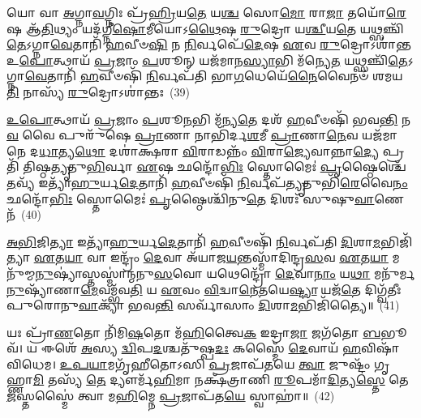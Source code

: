 {\anuvakamend[{\-\ul{𑌅}\-𑌗𑍍𑌨𑌯𑍇\-𑌽𑌦𑌿᳴\-\ul{𑌤𑍍𑌯𑌾} 𑌅𑌨𑍁᳴𑌮𑌤𑍍𑌯𑍈 \ul{𑌸}\-𑌪𑍍𑌤𑌚᳴𑌤𑍍𑌵𑌾𑌰𑌿𑍞𑌶𑌤𑍍}]}%

𑌯𑍋 𑌵𑌾 \ul{𑌅}\-𑌗𑍍𑌨𑌾\-\ul{𑌵}\-𑌗𑍍𑌨𑌿𑌃 𑌪𑍍𑌰᳴\-\ul{𑌹𑍍𑌰𑌿}\-𑌯\-\ul{𑌤𑍇} 𑌯\-\ul{𑌶𑍍𑌚} 𑌸𑍋\-\ul{𑌮𑍋} 𑌰𑌾\-\ul{𑌜𑌾} 𑌤𑌯𑍋᳴\-\ul{𑌰𑍇}\-𑌷 𑌆᳴\-\ul{𑌤𑌿}\-𑌥𑍍𑌯𑌂 𑌯𑌦᳴𑌗𑍍𑌨𑍀\-\ul{𑌷𑍋}\-𑌮𑍀𑌯𑍋\-𑌽\-\ul{𑌥𑍈}\-𑌷 \ul{𑌰𑍁}\-𑌦𑍍𑌰𑍋 𑌯\-\ul{𑌶𑍍𑌚𑍀}\-𑌯\-\ul{𑌤𑍇} 𑌯𑌥𑍍𑌸𑌞𑍍𑌚𑌿᳴\-\ul{𑌤𑍇}\-\-𑌽𑌗𑍍𑌨𑌾\-\ul{𑌵𑍇}\-𑌤𑌾𑌨𑌿᳴ \ul{𑌹}\-𑌵𑍀𑍞\-\ul{𑌷𑌿} 𑌨 \ul{𑌨𑌿}\-𑌰𑍍𑌵𑌪𑍇᳴\-\ul{𑌦𑍇}\-𑌷 \ul{𑌏}\-𑌵 \ul{𑌰𑍁}\-𑌦𑍍𑌰𑍋\-𑌽𑌶𑌾॑𑌨𑍍𑌤 𑌉\-\ul{𑌪𑍋}\-𑌤𑍍𑌥𑌾𑌯᳴ \ul{𑌪𑍍𑌰}\-𑌜𑌾𑌂 \ul{𑌪}\-𑌶𑍂𑌨𑍍 𑌯𑌜᳴𑌮𑌾𑌨\-\ul{𑌸𑍍𑌯𑌾}\-𑌭𑌿 𑌮᳴𑌨𑍍𑌯𑍇\-\ul{𑌤} 𑌯𑌥𑍍𑌸𑌞𑍍𑌚𑌿᳴\-\ul{𑌤𑍇}\-\-𑌽𑌗𑍍𑌨𑌾\-\ul{𑌵𑍇}\-𑌤𑌾𑌨𑌿᳴ \ul{𑌹}\-𑌵𑍀𑍞𑌷𑌿᳴ \ul{𑌨𑌿}\-𑌰𑍍𑌵𑌪᳴𑌤𑌿 𑌭𑌾\-\ul{𑌗}\-𑌧𑍇𑌯𑍇᳴\-\ul{𑌨𑍈}\-𑌵𑍈𑌨𑍞᳴ 𑌶𑌮𑌯\-\ul{𑌤𑌿} 𑌨𑌾𑌸𑍍𑌯᳴ \ul{𑌰𑍁}\-𑌦𑍍𑌰𑍋\-𑌽𑌶𑌾॑𑌨𑍍𑌤𑌃~(39)

\-\ul{𑌉}\-\-\ul{𑌪𑍋}\-𑌤𑍍𑌥𑌾𑌯᳴ \ul{𑌪𑍍𑌰}\-𑌜𑌾𑌂 \ul{𑌪}\-𑌶𑍂\-\ul{𑌨}\-𑌭𑌿 𑌮᳴𑌨𑍍𑌯\-\ul{𑌤𑍇} 𑌦𑌶᳴ \ul{𑌹}\-𑌵𑍀𑍞𑌷𑌿᳴ 𑌭𑌵\-\ul{𑌨𑍍𑌤𑌿} 𑌨\-\ul{𑌵} 𑌵𑍈 𑌪𑍁𑌰𑍁᳴𑌷𑍇 \ul{𑌪𑍍𑌰𑌾}\-𑌣𑌾 𑌨𑌾𑌭𑌿᳴𑌰𑍍𑌦\-\ul{𑌶}\-𑌮𑍀 \ul{𑌪𑍍𑌰𑌾}\-𑌣𑌾\-\ul{𑌨𑍇}\-𑌵 𑌯𑌜᳴𑌮𑌾𑌨𑍇 𑌦\-\ul{𑌧𑌾}\-𑌤𑍍𑌯\-\ul{𑌥𑍋} 𑌦𑌶𑌾॑𑌕𑍍𑌷𑌰𑌾 \ul{𑌵𑌿}\-𑌰𑌾𑌡𑌨𑍍𑌨𑌂᳴ \ul{𑌵𑌿}\-𑌰𑌾\-\ul{𑌜𑍍𑌯𑍇}\-𑌵𑌾𑌨𑍍𑌨𑌾\-\ul{𑌦𑍍𑌯𑍇} 𑌪𑍍𑌰𑌤𑌿᳴ 𑌤𑌿𑌷𑍍𑌠\-\ul{𑌤𑍍𑌯𑍃}\-𑌤𑍁\-\ul{𑌭𑌿}\-𑌰𑍍𑌵𑌾 \ul{𑌏}\-𑌷 𑌛𑌨𑍍𑌦𑍋᳴\-\ul{𑌭𑌿𑌃} 𑌸𑍍𑌤𑍋𑌮𑍈𑌃॑ \ul{𑌪𑍃}\-𑌷𑍍𑌠𑍈𑌶𑍍𑌚𑍇᳴\-\ul{𑌤}\-𑌵𑍍𑌯᳴ 𑌇𑌤𑍍𑌯𑌾᳴\-\ul{𑌹𑍁}\-𑌰𑍍𑌯\-\ul{𑌦𑍇}\-𑌤𑌾𑌨𑌿᳴ \ul{𑌹}\-𑌵𑍀𑍞𑌷𑌿᳴ \ul{𑌨𑌿}\-𑌰𑍍𑌵𑌪᳴\-\ul{𑌤𑍍𑌯𑍃}\-𑌤𑍁𑌭𑌿᳴\-\ul{𑌰𑍇}\-𑌵𑍈\-\ul{𑌨𑌂} 𑌛𑌨𑍍𑌦𑍋᳴\-\ul{𑌭𑌿𑌃} 𑌸𑍍𑌤𑍋𑌮𑍈𑌃॑ \ul{𑌪𑍃}\-𑌷𑍍𑌠𑍈𑌶𑍍𑌚𑌿᳴𑌨𑍁\-\ul{𑌤𑍇} 𑌦𑌿𑌶𑌃᳴ 𑌸𑍁𑌷𑍁\-\ul{𑌵𑌾}\-𑌣𑍇𑌨᳴~(40)

\-\ul{𑌅}\-\-\ul{𑌭𑌿}\-𑌜𑌿\-\ul{𑌤𑍍𑌯𑌾} 𑌇𑌤𑍍𑌯𑌾᳴\-\ul{𑌹𑍁}\-𑌰𑍍𑌯\-\ul{𑌦𑍇}\-𑌤𑌾𑌨𑌿᳴ \ul{𑌹}\-𑌵𑍀𑍞𑌷𑌿᳴ \ul{𑌨𑌿}\-𑌰𑍍𑌵𑌪᳴𑌤𑌿 \ul{𑌦𑌿}\-𑌶𑌾\-\ul{𑌮}\-𑌭𑌿𑌜𑌿᳴𑌤𑍍𑌯𑌾 \ul{𑌏}\-𑌤\-\ul{𑌯𑌾} 𑌵𑌾 𑌇𑌨𑍍𑌦𑍍𑌰𑌂᳴ \ul{𑌦𑍇}\-𑌵𑌾 𑌅᳴𑌯𑌾𑌜\-\ul{𑌯}\-𑌨𑍍𑌤𑌸𑍍𑌮𑌾᳴𑌦𑌿𑌨𑍍𑌦𑍍𑌰\-\ul{𑌸}\-𑌵 \ul{𑌏}\-𑌤\-\ul{𑌯𑌾} 𑌮𑌨𑍁᳴𑌮𑍍𑌮\-\ul{𑌨𑍁}\-𑌷𑍍𑌯𑌾॑𑌸𑍍𑌤𑌸𑍍𑌮𑌾॑𑌨𑍍𑌮𑌨𑍁\-\ul{𑌸}\-𑌵𑍋 𑌯𑌥𑍇𑌨𑍍𑌦𑍍𑌰𑍋᳴ \ul{𑌦𑍇}\-𑌵𑌾\-\ul{𑌨𑌾𑌂} 𑌯\-\ul{𑌥𑌾} 𑌮𑌨𑍁᳴𑌰𑍍𑌮\-\ul{𑌨𑍁}\-𑌷𑍍𑌯𑌾᳴𑌣𑌾\-\ul{𑌮𑍇}\-𑌵𑌮𑍍𑌭᳴𑌵\-\ul{𑌤𑌿} 𑌯 \ul{𑌏}\-𑌵𑌂 \ul{𑌵𑌿}\-𑌦𑍍𑌵𑌾\-\ul{𑌨𑍇}\-𑌤𑌯𑍇\-\ul{𑌷𑍍𑌟𑍍𑌯𑌾} 𑌯𑌜᳴\-\ul{𑌤𑍇} 𑌦𑌿𑌗𑍍𑌵᳴𑌤𑍀𑌃 𑌪𑍁𑌰𑍋𑌨𑍁\-\ul{𑌵𑌾}\-𑌕𑍍𑌯𑌾᳴ 𑌭𑌵\-\ul{𑌨𑍍𑌤𑌿} 𑌸𑌰𑍍𑌵𑌾᳴𑌸𑌾𑌂 \ul{𑌦𑌿}\-𑌶𑌾\-\ul{𑌮}\-𑌭𑌿𑌜𑌿᳴𑌤𑍍𑌯𑍈॥~(41)

{\anuvakamend[{𑌅𑌶𑌾॑𑌨𑍍𑌤𑌃 𑌸𑍁𑌷𑍁\-\ul{𑌵𑌾}\-𑌣𑍇𑌨𑍈𑌕᳴𑌚𑌤𑍍𑌵𑌾𑌰𑌿𑍞𑌶𑌚𑍍𑌚}]}%

𑌯𑌃 𑌪𑍍𑌰𑌾᳴\-\ul{𑌣}\-𑌤𑍋 𑌨𑌿᳴𑌮𑌿\-\ul{𑌷}\-𑌤𑍋 𑌮᳴\-\ul{𑌹𑌿}\-𑌤𑍍𑌵𑍈\-\ul{𑌕} 𑌇𑌦𑍍𑌰𑌾\-\ul{𑌜𑌾} 𑌜𑌗᳴𑌤𑍋 \ul{𑌬}\-𑌭𑍂𑌵᳴। 𑌯 𑌈𑌶𑍇᳴ \ul{𑌅}\-𑌸𑍍𑌯 \ul{𑌦𑍍𑌵𑌿}\-𑌪\-\ul{𑌦}\-𑌶𑍍𑌚𑌤𑍁᳴𑌷𑍍𑌪\-\ul{𑌦𑌃} 𑌕𑌸𑍍𑌮𑍈᳴ \ul{𑌦𑍇}\-𑌵𑌾𑌯᳴ \ul{𑌹}\-𑌵𑌿𑌷𑌾᳴ 𑌵𑌿𑌧𑍇𑌮। \ul{𑌉}\-\-\ul{𑌪}\-\-\ul{𑌯𑌾}\-𑌮𑌗𑍃᳴𑌹𑍀𑌤𑍋\-𑌽𑌸𑌿 \ul{𑌪𑍍𑌰}\-𑌜𑌾𑌪᳴𑌤𑌯𑍇 \ul{𑌤𑍍𑌵𑌾} 𑌜𑍁𑌷𑍍𑌟𑌂᳴ 𑌗𑍃𑌹𑍍𑌣𑌾\-\ul{𑌮𑌿} 𑌤𑌸𑍍𑌯᳴ \ul{𑌤𑍇} 𑌦𑍍𑌯𑍗𑌰𑍍𑌮᳴\-\ul{𑌹𑌿}\-𑌮𑌾 𑌨𑌕𑍍𑌷᳴𑌤𑍍𑌰𑌾𑌣𑌿 \ul{𑌰𑍂}\-𑌪𑌮𑌾᳴\-\ul{𑌦𑌿}\-𑌤𑍍𑌯\-\ul{𑌸𑍍𑌤𑍇} 𑌤𑍇\-\ul{𑌜}\-𑌸𑍍𑌤𑌸𑍍𑌮𑍈॑ 𑌤𑍍𑌵𑌾 𑌮\-\ul{𑌹𑌿}\-𑌮𑍍𑌨𑍇 \ul{𑌪𑍍𑌰}\-𑌜𑌾𑌪᳴𑌤\-\ul{𑌯𑍇} 𑌸𑍍𑌵𑌾𑌹𑌾॑॥~(42)

